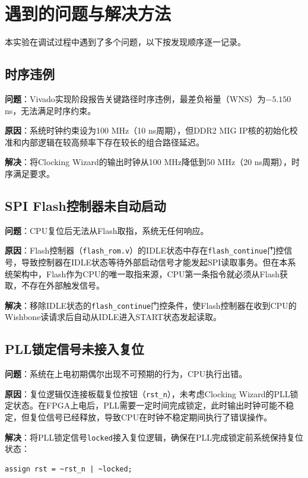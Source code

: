 \section{遇到的问题与解决方法}

本实验在调试过程中遇到了多个问题，以下按发现顺序逐一记录。

\subsection{时序违例}

\textbf{问题}：Vivado实现阶段报告关键路径时序违例，最差负裕量（WNS）为$-5.150$ ns，无法满足时序约束。

\textbf{原因}：系统时钟约束设为100 MHz（10 ns周期），但DDR2 MIG IP核的初始化校准和内部逻辑在较高频率下存在较长的组合路径延迟。

\textbf{解决}：将Clocking Wizard的输出时钟从100 MHz降低到50 MHz（20 ns周期），时序满足要求。

\subsection{SPI Flash控制器未自动启动}

\textbf{问题}：CPU复位后无法从Flash取指，系统无任何响应。

\textbf{原因}：Flash控制器（\texttt{flash\_rom.v}）的IDLE状态中存在\texttt{flash\_continue}门控信号，导致控制器在IDLE状态等待外部启动信号才能发起SPI读取事务。但在本系统架构中，Flash作为CPU的唯一取指来源，CPU第一条指令就必须从Flash获取，不存在外部触发信号。

\textbf{解决}：移除IDLE状态的\texttt{flash\_continue}门控条件，使Flash控制器在收到CPU的Wishbone读请求后自动从IDLE进入START状态发起读取。

\subsection{PLL锁定信号未接入复位}

\textbf{问题}：系统在上电初期偶尔出现不可预期的行为，CPU执行出错。

\textbf{原因}：复位逻辑仅连接板载复位按钮（\texttt{rst\_n}），未考虑Clocking Wizard的PLL锁定状态。在FPGA上电后，PLL需要一定时间完成锁定，此时输出时钟可能不稳定，但复位信号已经释放，导致CPU在时钟不稳定期间执行了错误操作。

\textbf{解决}：将PLL锁定信号\texttt{locked}接入复位逻辑，确保在PLL完成锁定前系统保持复位状态：
\begin{lstlisting}[caption={PLL锁定接入复位}]
assign rst = ~rst_n | ~locked;
\end{lstlisting}

